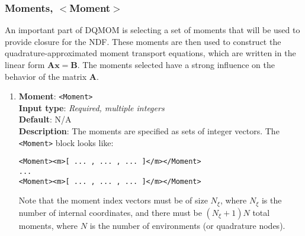 \subsubsection{Moments, $<$Moment$>$}
%
An important part of DQMOM is selecting a set of moments that will be used to provide closure for the NDF. These moments are then used to construct the quadrature-approximated moment transport equations, which are written in the linear form $\mathbf{Ax} = \mathbf{B}$. The moments selected have a strong influence on the behavior of the matrix $\mathbf{A}$.
%
\begin{enumerate}
%
\item {\bf Moment}: \verb=<Moment>= \\
{\bf Input type}: {\it Required, multiple integers} \\
{\bf Default}: N/A \\
{\bf Description}: The moments are specified as sets of integer vectors. The \verb=<Moment>= block looks like:
\begin{Verbatim}
<Moment><m>[ ... , ... , ... ]</m></Moment>
...
<Moment><m>[ ... , ... , ... ]</m></Moment>
\end{Verbatim}
Note that the moment index vectors must be of size $N_{\xi}$, where $N_{\xi}$ is the number of internal coordinates, and there must be $\left( N_{\xi} + 1 \right) N$ total moments, where $N$ is the number of environments (or quadrature nodes).
%
\end{enumerate}



